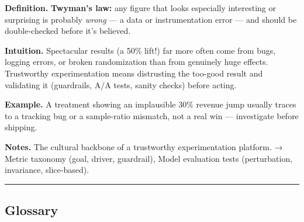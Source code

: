 \documentclass[
  10pt,
  letterpaper,
  onecolumn]{article}
\begin{document}
\textbf{Definition.} \textbf{Twyman's law:} any figure that looks
especially interesting or surprising is probably \emph{wrong} --- a data
or instrumentation error --- and should be double-checked before it's
believed.

\textbf{Intuition.} Spectacular results (a 50\% lift!) far more often
come from bugs, logging errors, or broken randomization than from
genuinely huge effects. Trustworthy experimentation means distrusting
the too-good result and validating it (guardrails, A/A tests, sanity
checks) before acting.

\textbf{Example.} A treatment showing an implausible 30\% revenue jump
usually traces to a tracking bug or a sample-ratio mismatch, not a real
win --- investigate before shipping.

\textbf{Notes.} The cultural backbone of a trustworthy experimentation
platform. → Metric taxonomy (goal, driver, guardrail), Model evaluation
tests (perturbation, invariance, slice-based).

\begin{center}\rule{0.5\linewidth}{0.5pt}\end{center}

\hypertarget{glossary}{%
\subsection{Glossary}\label{glossary}}
\end{document}

